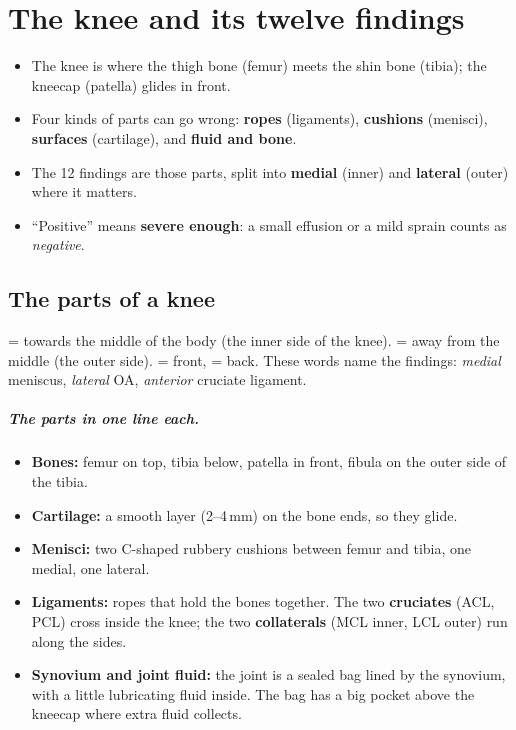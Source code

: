 \chapter{The knee and its twelve findings}
\label{ch:knee}

\begin{tldr}
\begin{itemize}
\item The knee is where the thigh bone (femur) meets the shin bone (tibia); the kneecap (patella) glides in front.
\item Four kinds of parts can go wrong: \textbf{ropes} (ligaments), \textbf{cushions} (menisci),
      \textbf{surfaces} (cartilage), and \textbf{fluid and bone}.
\item The 12 findings are those parts, split into \textbf{medial} (inner) and \textbf{lateral} (outer) where it matters.
\item ``Positive'' means \textbf{severe enough}: a small effusion or a mild sprain counts as \emph{negative}.
\end{itemize}
\end{tldr}

\section{The parts of a knee}

\begin{wordcheck}
 = towards the middle of the body (the inner side of the knee).  = away from the
middle (the outer side).  = front,  = back. These words name the findings:
\emph{medial} meniscus, \emph{lateral} OA, \emph{anterior} cruciate ligament.
\end{wordcheck}

\paragraph{The parts in one line each.}
\begin{itemize}
\item \textbf{Bones:} femur on top, tibia below, patella in front, fibula on the outer side of the tibia.
\item \textbf{Cartilage:} a smooth layer (2--4\,mm) on the bone ends, so they glide.
\item \textbf{Menisci:} two C-shaped rubbery cushions between femur and tibia, one medial, one lateral.
\item \textbf{Ligaments:} ropes that hold the bones together. The two \textbf{cruciates} (ACL, PCL) cross inside
      the knee; the two \textbf{collaterals} (MCL inner, LCL outer) run along the sides.
\item \textbf{Synovium and joint fluid:} the joint is a sealed bag lined by the synovium, with a little lubricating
      fluid inside. The bag has a big pocket above the kneecap where extra fluid collects.
\end{itemize}

